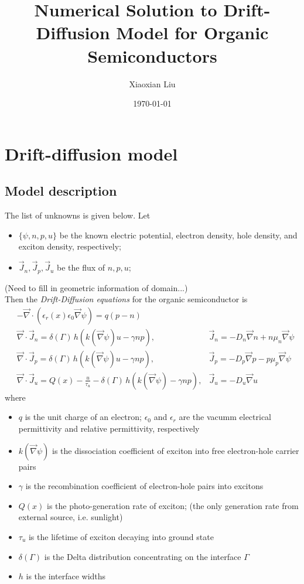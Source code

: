 \documentclass{article}
\title{Numerical Solution to Drift-Diffusion Model for Organic Semiconductors}
\author{Xiaoxian Liu}
\date{\today}
\newcommand{\grad}{\overrightarrow{\nabla}}
\newcommand{\Jn}{\overrightarrow{J}_n}
\newcommand{\Jp}{\overrightarrow{J}_p}
\newcommand{\Ju}{\overrightarrow{J}_u}
\begin{document}
\maketitle


\section{Drift-diffusion model}
 \subsection{Model description}
 The list of unknowns is given below. Let
 \begin{itemize}
  \item $\{\psi, n, p, u\}$ be the known electric potential, electron density, hole density, and exciton density, 
 respectively;
  \item $\Jn, \Jp, \Ju$ be the flux of $n, p, u$;
 \end{itemize}
 
 (Need to fill in geometric information of domain...)\\
 
 Then the {\it Drift-Diffusion equations} for the organic semiconductor is
 \begin{align}
  &-\grad\cdot\left( \epsilon_r(x) \epsilon_0 \grad \psi \right) = q(p-n) 
    &\\
  &\grad\cdot \Jn = \delta(\Gamma)\, h\left( k(\grad\psi) u - \gamma np \right), 
    & \Jn = -D_n\grad n + n\mu_n\grad\psi \\
  &\grad\cdot \Jp = \delta(\Gamma)\, h\left( k(\grad\psi) u - \gamma np \right), 
    & \Jp = -D_p\grad p - p\mu_p\grad\psi \\
  &\grad\cdot \Ju = Q(x) - \frac{u}{\tau_u} - \delta(\Gamma)\, h\left( k(\grad\psi) - \gamma np \right),
    & \Ju = -D_u\grad u
 \end{align}
 where
 \begin{itemize}
  \item $q$ is the unit charge of an electron; $\epsilon_0$ and $\epsilon_r$ are the vacumm electrical permittivity 
    and relative permittivity, respectively
  \item $k(\grad \psi)$ is the dissociation coefficient of exciton into free electron-hole carrier pairs
  \item $\gamma$ is the recombination coefficient of electron-hole pairs into excitons
  \item $Q(x)$ is the photo-generation rate of exciton; (the only generation rate from external source, i.e. sunlight)
  \item $\tau_u$ is the lifetime of exciton decaying into ground state
  \item $\delta(\Gamma)$ is the Delta distribution concentrating on the interface $\Gamma$
  \item $h$ is the interface widths
 \end{itemize}
 
\end{document}
